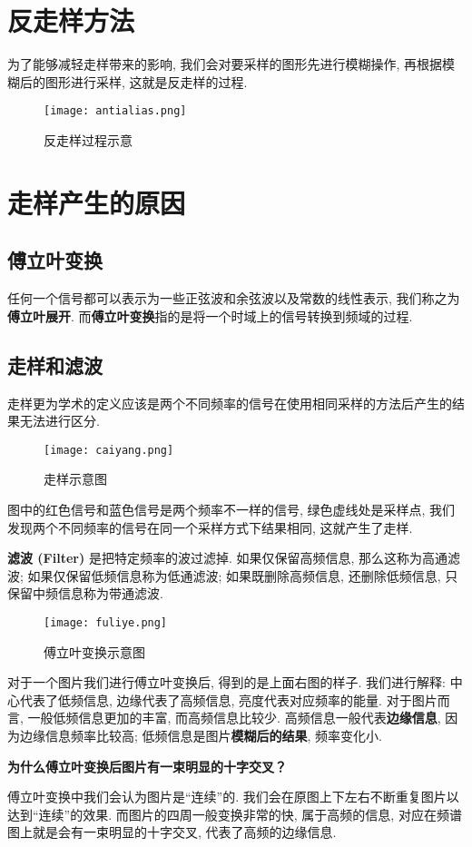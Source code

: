\documentclass[openany]{progbookcn}
\begin{document}
\section{反走样方法}
为了能够减轻走样带来的影响, 我们会对要采样的图形先进行模糊操作, 再根据模糊后的图形进行采样, 这就是反走样的过程. 
\begin{figure}[H]
	\centering
	\texttt{[image: antialias.png]}
	\caption{反走样过程示意}
	\label{fig:antialias}
\end{figure}

\section{走样产生的原因}
\subsection{傅立叶变换}
任何一个信号都可以表示为一些正弦波和余弦波以及常数的线性表示, 我们称之为\textbf{傅立叶展开}. 而\textbf{傅立叶变换}指的是将一个时域上的信号转换到频域的过程. 
\subsection{走样和滤波}
走样更为学术的定义应该是两个不同频率的信号在使用相同采样的方法后产生的结果无法进行区分. 
\begin{figure}[H]
	\centering
	\texttt{[image: caiyang.png]}
	\caption{走样示意图}
	\label{fig:alias}
\end{figure}
图中的红色信号和蓝色信号是两个频率不一样的信号, 绿色虚线处是采样点, 我们发现两个不同频率的信号在同一个采样方式下结果相同, 这就产生了走样. 

\textbf{滤波 (Filter) }是把特定频率的波过滤掉. 如果仅保留高频信息, 那么这称为高通滤波; 如果仅保留低频信息称为低通滤波; 如果既删除高频信息, 还删除低频信息, 只保留中频信息称为带通滤波. 

\begin{figure}[H]
	\centering
	\texttt{[image: fuliye.png]}
	\caption{傅立叶变换示意图}
	\label{fig:fuliye}
\end{figure}
对于一个图片我们进行傅立叶变换后, 得到的是上面右图的样子. 我们进行解释: 中心代表了低频信息, 边缘代表了高频信息, 亮度代表对应频率的能量. 对于图片而言, 一般低频信息更加的丰富, 而高频信息比较少. 高频信息一般代表\textbf{边缘信息}, 因为边缘信息频率比较高; 低频信息是图片\textbf{模糊后的结果}, 频率变化小. 
\begin{question}
\textbf{为什么傅立叶变换后图片有一束明显的十字交叉？}

傅立叶变换中我们会认为图片是“连续”的. 我们会在原图上下左右不断重复图片以达到“连续”的效果. 而图片的四周一般变换非常的快, 属于高频的信息, 对应在频谱图上就是会有一束明显的十字交叉, 代表了高频的边缘信息. 
\end{question}
\end{document}
